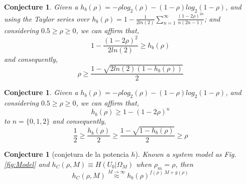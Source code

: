 \documentclass[a4paper,10pt]{article}
\newtheorem{conjecture}[mytheorem]{Conjecture}
\begin{document}
\begin{mdframed}[style=MDFStyGrayScreen]
\begin{conjecture}
Given a $h_{b}(\rho)=-\rho log_2(\rho)-(1-\rho) log_2(1-\rho)$,
and using the Taylor series over $h_{b}(\rho)=1-\frac{1}{2ln(2)}\sum_{n=1}^{\infty}\frac{(1-2\rho)^{2n}}{n(2n-1)}$;
and considering $0.5\geq \rho \geq 0$, we can affirm that,
 \label{lemm:hbapprox2}
\begin{equation}\label{eq:hbapprox2_1}
 1-\frac{(1-2\rho)^{2}}{2ln(2)}\geq h_{b}(\rho) 
\end{equation}
and consequently,
\begin{equation}\label{eq:hbapprox2_2}
\rho \geq  \frac{1-\sqrt{2 ln(2)(1-h_{b}(\rho))}}{2}
\end{equation}
\end{conjecture}
\end{mdframed}

\begin{mdframed}[style=MDFStyGrayScreen]
\begin{conjecture}
\label{lemm:hbapprox2b}
Given a $h_{b}(\rho)=-\rho log_2(\rho)-(1-\rho) log_2(1-\rho)$,
and considering $0.5\geq \rho \geq 0$, we can affirm that,
\begin{equation}\label{eq:hbapprox2b_1}
h_{b}(\rho)\geq 1-(1-2\rho)^{n}  
\end{equation}
to $n=\{0, 1, 2\}$ and consequently,
\begin{equation}\label{eq:hbapprox2b_2}
\frac{1}{2}\geq \frac{h_{b}(\rho)}{2}\geq \frac{1-\sqrt{1-h_{b}(\rho)}}{2}\geq  \rho
\end{equation}
\end{conjecture}
\end{mdframed}


\begin{mdframed}[style=MDFStyGrayScreen]
\begin{conjecture}[conjetura de la potencia $h$]
 \label{lemm:h0OmegaM_2}
 Known a system model as Fig. \ref{fig:Model} and $h_{C}(\rho,M)\equiv H(U_0|\Omega_M)$ when $\rho_m=\rho$, then
\begin{equation}\label{eq:Hconjecture1}
h_{C}(\rho,M)  \stackrel{M \rightarrow \infty }{\approx} h_{b}(\rho)^{f(\rho)~M+g(\rho)}
\end{equation}
\end{conjecture}
\end{mdframed}
\end{document}
